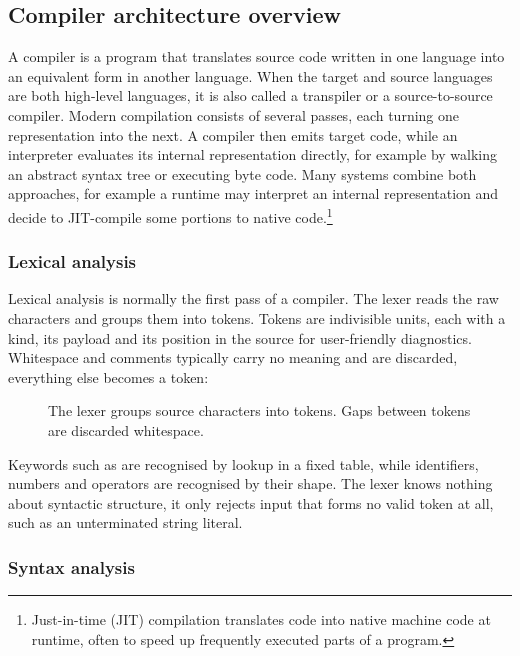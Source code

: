 
\subsection{Compiler architecture overview}
\label{sec:compiler}

A compiler is a program that translates source code written in one language
into an equivalent form in another language.
When the target and source languages are both high-level languages,
it is also called a transpiler or a source-to-source compiler.
Modern compilation consists of several passes,
each turning one representation into the next.
A compiler then emits target code,
while an interpreter evaluates its internal representation directly,
for example by walking an abstract syntax tree or executing byte code.
Many systems combine both approaches,
for example a runtime may interpret an internal representation
and decide to JIT-compile some portions to native code.\footnote{
	Just-in-time (JIT) compilation translates code
	into native machine code at runtime,
	often to speed up frequently executed parts of a program.
}

\subsubsection{Lexical analysis}

Lexical analysis is normally the first pass of a compiler.
The lexer reads the raw characters and groups them into tokens.
Tokens are indivisible units, each with a kind, its payload
and its position in the source for user-friendly diagnostics.
Whitespace and comments typically carry no meaning and are discarded,
everything else becomes a token:

\begin{figure}[H]
	\centering
	
	\caption{The lexer groups source characters into tokens. Gaps between tokens are discarded whitespace.}
	\label{fig:tokens}
\end{figure}

Keywords such as  are recognised by lookup in a fixed table,
while identifiers, numbers and operators are recognised by their shape.
The lexer knows nothing about syntactic structure,
it only rejects input that forms no valid token at all,
such as an unterminated string literal.

\subsubsection{Syntax analysis}

